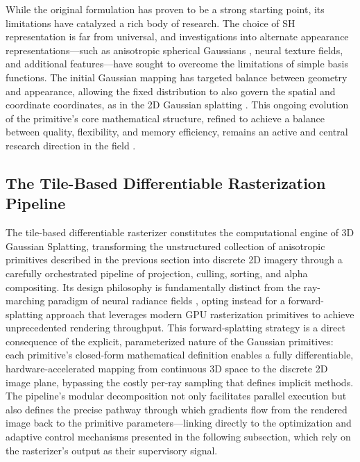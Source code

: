 \documentclass[11pt,a4paper]{article}
\begin{document}
While the original formulation has proven to be a strong starting point, its limitations have catalyzed a rich body of research. The choice of SH representation is far from universal, and investigations into alternate appearance representations---such as anisotropic spherical Gaussians \cite{arxiv:2402.15870v1}, neural texture fields, and additional features---have sought to overcome the limitations of simple basis functions. The initial Gaussian mapping has targeted balance between geometry and appearance, allowing the fixed distribution to also govern the spatial and coordinate coordinates, as in the 2D Gaussian splatting \cite{arxiv:2403.17888v1}. This ongoing evolution of the primitive's core mathematical structure, refined to achieve a balance between quality, flexibility, and memory efficiency, remains an active and central research direction in the field \cite{arxiv:2401.03890v2,arxiv:2403.11134v2}.


\subsection{The Tile-Based Differentiable Rasterization Pipeline}


The tile-based differentiable rasterizer constitutes the computational engine of 3D Gaussian Splatting, transforming the unstructured collection of anisotropic primitives described in the previous section into discrete 2D imagery through a carefully orchestrated pipeline of projection, culling, sorting, and alpha compositing. Its design philosophy is fundamentally distinct from the ray-marching paradigm of neural radiance fields \cite{arxiv:2112.05131v1}, opting instead for a forward-splatting approach that leverages modern GPU rasterization primitives to achieve unprecedented rendering throughput. This forward-splatting strategy is a direct consequence of the explicit, parameterized nature of the Gaussian primitives: each primitive's closed-form mathematical definition enables a fully differentiable, hardware-accelerated mapping from continuous 3D space to the discrete 2D image plane, bypassing the costly per-ray sampling that defines implicit methods. The pipeline's modular decomposition not only facilitates parallel execution but also defines the precise pathway through which gradients flow from the rendered image back to the primitive parameters---linking directly to the optimization and adaptive control mechanisms presented in the following subsection, which rely on the rasterizer's output as their supervisory signal.
\end{document}
